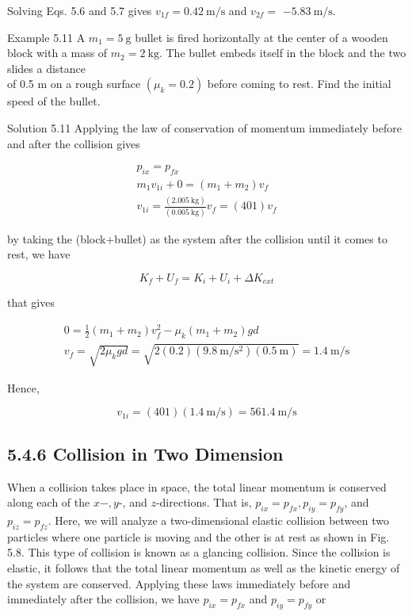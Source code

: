 \documentclass[10pt]{article}
\begin{document}
Solving Eqs. 5.6 and 5.7 gives $v_{1 f}=0.42 \mathrm{~m} / \mathrm{s}$ and $v_{2 f}=$ $-5.83 \mathrm{~m} / \mathrm{s}$.

Example 5.11 A $m_{1}=5 \mathrm{~g}$ bullet is fired horizontally at the center of a wooden block with a mass of $m_{2}=2 \mathrm{~kg}$. The bullet embeds itself in the block and the two slides a distance\\
of 0.5 m on a rough surface $\left(\mu_{k}=0.2\right)$ before coming to rest. Find the initial speed of the bullet.

Solution 5.11 Applying the law of conservation of momentum immediately before and after the collision gives

$$
\begin{gathered}
p_{i x}=p_{f x} \\
m_{1} v_{1 i}+0=\left(m_{1}+m_{2}\right) v_{f} \\
v_{1 i}=\frac{(2.005 \mathrm{~kg})}{(0.005 \mathrm{~kg})} v_{f}=(401) v_{f}
\end{gathered}
$$

by taking the (block+bullet) as the system after the collision until it comes to rest, we have

$$
K_{f}+U_{f}=K_{i}+U_{i}+\Delta K_{e x t}
$$

that gives

$$
\begin{gathered}
0=\frac{1}{2}\left(m_{1}+m_{2}\right) v_{f}^{2}-\mu_{k}\left(m_{1}+m_{2}\right) g d \\
v_{f}=\sqrt{2 \mu_{k} g d}=\sqrt{2(0.2)\left(9.8 \mathrm{~m} / \mathrm{s}^{2}\right)(0.5 \mathrm{~m})}=1.4 \mathrm{~m} / \mathrm{s}
\end{gathered}
$$

Hence,

$$
v_{1 i}=(401)(1.4 \mathrm{~m} / \mathrm{s})=561.4 \mathrm{~m} / \mathrm{s}
$$

\subsection*{5.4.6 Collision in Two Dimension}
When a collision takes place in space, the total linear momentum is conserved along each of the $x-, y$-, and $z$-directions. That is, $p_{i x}=p_{f x}, p_{i y}=p_{f y}$, and $p_{i z}=p_{f z}$. Here, we will analyze a two-dimensional elastic collision between two particles where one particle is moving and the other is at rest as shown in Fig. 5.8. This type of collision is known as a glancing collision. Since the collision is elastic, it follows that the total linear momentum as well as the kinetic energy of the system are conserved. Applying these laws immediately before and immediately after the collision, we have $p_{i x}=p_{f x}$ and $p_{i y}=p_{f y}$ or
\end{document}
